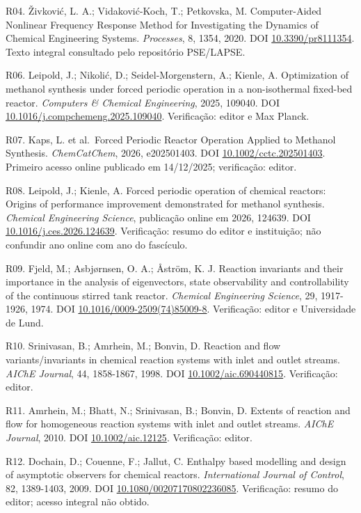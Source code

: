 \documentclass[
  11pt,
  letterpaper,
]{article}
\begin{document}
R04. Živković, L. A.; Vidaković-Koch, T.; Petkovska, M. Computer-Aided
Nonlinear Frequency Response Method for Investigating the Dynamics of
Chemical Engineering Systems. \emph{Processes}, 8, 1354, 2020. DOI
\href{https://doi.org/10.3390/pr8111354}{10.3390/pr8111354}. Texto
integral consultado pelo repositório PSE/LAPSE.

R06. Leipold, J.; Nikolić, D.; Seidel-Morgenstern, A.; Kienle, A.
Optimization of methanol synthesis under forced periodic operation in a
non-isothermal fixed-bed reactor. \emph{Computers \& Chemical
Engineering}, 2025, 109040. DOI
\href{https://doi.org/10.1016/j.compchemeng.2025.109040}{10.1016/j.compchemeng.2025.109040}.
Verificação: editor e Max Planck.

R07. Kaps, L. et al.~Forced Periodic Reactor Operation Applied to
Methanol Synthesis. \emph{ChemCatChem}, 2026, e202501403. DOI
\href{https://doi.org/10.1002/cctc.202501403}{10.1002/cctc.202501403}.
Primeiro acesso online publicado em 14/12/2025; verificação: editor.

R08. Leipold, J.; Kienle, A. Forced periodic operation of chemical
reactors: Origins of performance improvement demonstrated for methanol
synthesis. \emph{Chemical Engineering Science}, publicação online em
2026, 124639. DOI
\href{https://doi.org/10.1016/j.ces.2026.124639}{10.1016/j.ces.2026.124639}.
Verificação: resumo do editor e instituição; não confundir ano online
com ano do fascículo.

R09. Fjeld, M.; Asbjørnsen, O. A.; Åström, K. J. Reaction invariants and
their importance in the analysis of eigenvectors, state observability
and controllability of the continuous stirred tank reactor.
\emph{Chemical Engineering Science}, 29, 1917-1926, 1974. DOI
\href{https://doi.org/10.1016/0009-2509(74)85009-8}{10.1016/0009-2509(74)85009-8}.
Verificação: editor e Universidade de Lund.

R10. Srinivasan, B.; Amrhein, M.; Bonvin, D. Reaction and flow
variants/invariants in chemical reaction systems with inlet and outlet
streams. \emph{AIChE Journal}, 44, 1858-1867, 1998. DOI
\href{https://doi.org/10.1002/aic.690440815}{10.1002/aic.690440815}.
Verificação: editor.

R11. Amrhein, M.; Bhatt, N.; Srinivasan, B.; Bonvin, D. Extents of
reaction and flow for homogeneous reaction systems with inlet and outlet
streams. \emph{AIChE Journal}, 2010. DOI
\href{https://doi.org/10.1002/aic.12125}{10.1002/aic.12125}.
Verificação: editor.

R12. Dochain, D.; Couenne, F.; Jallut, C. Enthalpy based modelling and
design of asymptotic observers for chemical reactors.
\emph{International Journal of Control}, 82, 1389-1403, 2009. DOI
\href{https://doi.org/10.1080/00207170802236085}{10.1080/00207170802236085}.
Verificação: resumo do editor; acesso integral não obtido.
\end{document}
